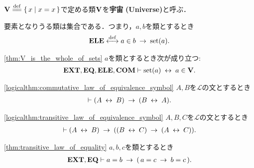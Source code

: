 	\begin{screen}
		\begin{dfn}[宇宙]
			$\Univ \defeq \Set{x}{x=x}$で定める類$\mathbf{V}$を{\bf 宇宙}
			{\bf (Universe)}と呼ぶ．
		\end{dfn}
	\end{screen}
	
	\begin{screen}
		\begin{axm}[要素の公理]
			要素となりうる類は集合である．つまり，$a,b$を類とするとき
			\begin{align}
				\mbox{{\bf ELE}} \overset{\mathrm{def}}{\longleftrightarrow} a \in b \hspace{0.25em}\rightarrow\hspace{0.25em} \operatorname*{set} (a).
			\end{align}
		\end{axm}
	\end{screen}
	
	\begin{screen}
		\begin{thm}
		\ref{thm:V_is_the_whole_of_sets}
			$a$を類とするとき次が成り立つ:
			\begin{align}
				\mbox{{\bf EXT}},\mbox{{\bf EQ}},\mbox{{\bf ELE}},\mbox{\bf COM} \vdash \operatorname*{set} (a) \hspace{0.25em}\leftrightarrow\hspace{0.25em} a \in \mathbf{V}.
			\end{align}
		\end{thm}
	\end{screen}
	
	\begin{screen}
		\begin{logicalthm}[同値関係の可換律]
		\ref{logicalthm:commutative_law_of_equivalence_symbol}
			$A,B$を$\mathcal{L}$の文とするとき
			\begin{align}
				\vdash (A \hspace{0.25em}\leftrightarrow\hspace{0.25em} B) \hspace{0.25em}\rightarrow\hspace{0.25em} (B \hspace{0.25em}\leftrightarrow\hspace{0.25em} A).
			\end{align}
		\end{logicalthm}
	\end{screen}
	
	\begin{screen}
		\begin{logicalthm}[同値関係の推移律]
		\ref{logicalthm:transitive_law_of_equivalence_symbol}
			$A,B,C$を$\mathcal{L}$の文とするとき
			\begin{align}
				\vdash (A \hspace{0.25em}\leftrightarrow\hspace{0.25em} B) \hspace{0.25em}\rightarrow\hspace{0.25em} ((B \hspace{0.25em}\leftrightarrow\hspace{0.25em} C) \hspace{0.25em}\rightarrow\hspace{0.25em} 
				(A \hspace{0.25em}\leftrightarrow\hspace{0.25em} C)).
			\end{align}
		\end{logicalthm}
	\end{screen}
	
	\begin{screen}
		\begin{thm}[等号の推移律]\ref{thm:transitive_law_of_equality}
			$a,b,c$を類とするとき
			\begin{align}
				\mbox{{\bf EXT}},\mbox{{\bf EQ}} \vdash a = b \hspace{0.25em}\rightarrow\hspace{0.25em} (\, a = c \hspace{0.25em}\rightarrow\hspace{0.25em} b = c\, ).
			\end{align}
		\end{thm}
	\end{screen}
	
